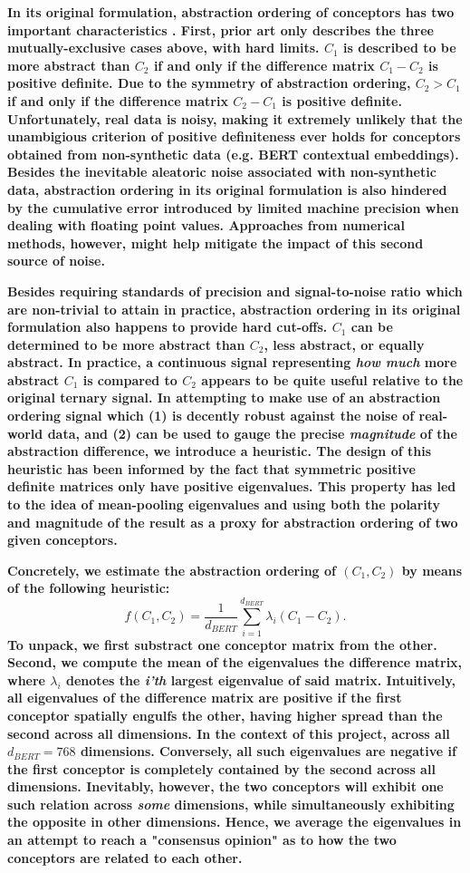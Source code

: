 \textbf{In its original formulation, abstraction ordering of conceptors has two important characteristics \citep{jaeger_controlling_2017}. First, prior art only describes the three mutually-exclusive cases above, with hard limits. $C_1$ is described to be more abstract than $C_2$ if and only if the difference matrix $C_1 - C_2$ is positive definite. Due to the symmetry of abstraction ordering, $C_2 > C_1$ if and only if the difference matrix $C_2 - C_1$ is positive definite. Unfortunately, real data is noisy, making it extremely unlikely that the unambigious criterion of positive definiteness ever holds for conceptors obtained from non-synthetic data (e.g. BERT contextual embeddings). Besides the inevitable aleatoric noise associated with non-synthetic data, abstraction ordering in its original formulation is also hindered by the cumulative error introduced by limited machine precision when dealing with floating point values. Approaches from numerical methods, however, might help mitigate the impact of this second source of noise.}

\textbf{Besides requiring standards of precision and signal-to-noise ratio which are non-trivial to attain in practice, abstraction ordering in its original formulation also happens to provide hard cut-offs. $C_1$ can be determined to be more abstract than $C_2$, less abstract, or equally abstract. In practice, a continuous signal representing \textit{how much} more abstract $C_1$ is compared to $C_2$ appears to be quite useful relative to the original ternary signal. In attempting to make use of an abstraction ordering signal which (1) is decently robust against the noise of real-world data, and (2) can be used to gauge the precise \textit{magnitude} of the abstraction difference, we introduce a heuristic. The design of this heuristic has been informed by the fact that symmetric positive definite matrices only have positive eigenvalues. This property has led to the idea of mean-pooling eigenvalues and using both the polarity and magnitude of the result as a proxy for abstraction ordering of two given conceptors.}

\textbf{Concretely, we estimate the abstraction ordering of $(C_1, C_2)$ by means of the following heuristic:$$f(C_1, C_2) = \frac{1}{d_{BERT}} \sum\limits_{i=1}^{d_{BERT}} \lambda_i(C_1 - C_2).$$ To unpack, we first substract one conceptor matrix from the other. Second, we compute the mean of the eigenvalues the difference matrix, where $\lambda_i$ denotes the \textit{i'th} largest eigenvalue of said matrix. Intuitively, all eigenvalues of the difference matrix are positive if the first conceptor spatially engulfs the other, having higher spread than the second across all dimensions. In the context of this project, across all $d_{BERT} = 768$ dimensions. Conversely, all such eigenvalues are negative if the first conceptor is completely contained by the second across all dimensions. Inevitably, however, the two conceptors will exhibit one such relation across \textit{some} dimensions, while simultaneously exhibiting the opposite in other dimensions. Hence, we average the eigenvalues in an attempt to reach a "consensus opinion" as to how the two conceptors are related to each other.}

